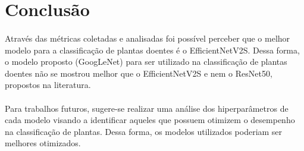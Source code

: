 \documentclass[12pt]{article}
\begin{document}
\section{Conclusão}

\paragraph{}Através das métricas coletadas e analisadas foi possível perceber que o melhor modelo para a classificação de plantas doentes é o EfficientNetV2S. Dessa forma, o modelo proposto (GoogLeNet) para ser utilizado na classificação de plantas doentes não se mostrou melhor que o EfficientNetV2S e nem o ResNet50, propostos na literatura.

\paragraph{}Para trabalhos futuros, sugere-se realizar uma análise dos hiperparâmetros de cada modelo visando a identificar aqueles que possuem otimizem o desempenho na classificação de plantas. Dessa forma, os modelos utilizados poderiam ser melhores otimizados.




\end{document}
